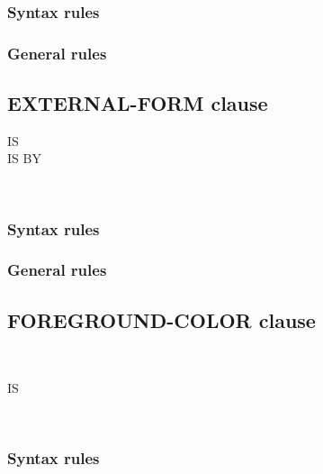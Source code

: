 \subsubsection{Syntax rules}

\subsubsection{General rules}

\subsection{EXTERNAL-FORM clause}

\begin{syntax}[\miscextcolour]  
  \begin{1+}
    IS  \\

    IS  BY
    \begin{1=}
      \identifier \\
      \literal
    \end{1=}
  \end{1+}
\end{syntax}

\subsubsection{Syntax rules}

\subsubsection{General rules}

\subsection{FOREGROUND-COLOR clause}

\begin{syntax}
  \begin{1=}
     \\
  \end{1=}
  IS
  \begin{1=}
    \identifier \\
    \literal
  \end{1=}
\end{syntax}

\subsubsection{Syntax rules}


